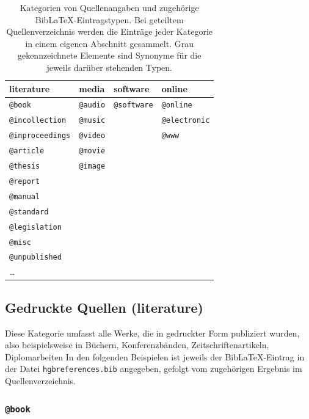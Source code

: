 \begin{table}
\caption{Kategorien von Quellenangaben und zugehörige BibLaTeX-Eintragstypen.
Bei geteiltem Quellenverzeichnis werden die Einträge jeder Kategorie in einem
eigenen Abschnitt gesammelt. Grau gekennzeichnete Elemente sind Synonyme für
die jeweils darüber stehenden Typen.}
\label{tab:BibKategorien}
\centering
{}
\setlength{\tabcolsep}{4mm}
\begin{tabular}{@{}llll@{}}
	\toprule
	\textsf{literature} & \textsf{media} & \textsf{software} & \textsf{online} \\
	\midrule
	\texttt{@book} & \texttt{@audio} & \texttt{@software} & \texttt{@online} \\
	\texttt{@incollection} & \texttt{\color{midgray}@music} & & \texttt{\color{midgray}@electronic} \\
	\texttt{@inproceedings} & \texttt{@video} & & \texttt{\color{midgray}@www} \\
	\texttt{@article} & \texttt{@movie} & & \\
	\texttt{@thesis} & \texttt{@image} & & \\
	\texttt{@report} & & & \\
	\texttt{@manual} & & & \\
	\texttt{@standard} & & & \\
	\texttt{@legislation} & & & \\
	\texttt{@misc} & & &  \\
	\texttt{@unpublished} &  & & \\
	\ldots & & & \\
	\bottomrule
\end{tabular}
\end{table}



\subsection{Gedruckte Quellen (\textsf{literature})}
\label{sec:KategorieLiterature}

Diese Kategorie umfasst alle Werke, die in gedruckter Form publiziert wurden,
also beispielsweise in Büchern, Konferenzbänden, Zeitschriftenartikeln,
Diplomarbeiten \usw In den folgenden Beispielen ist jeweils der
BibLaTeX-Eintrag in der Datei \nolinkurl{hgbreferences.bib} angegeben, gefolgt
vom zugehörigen Ergebnis im Quellenverzeichnis.


\subsubsection{\texttt{\bfseries @book}}
\label{sec:@book}

